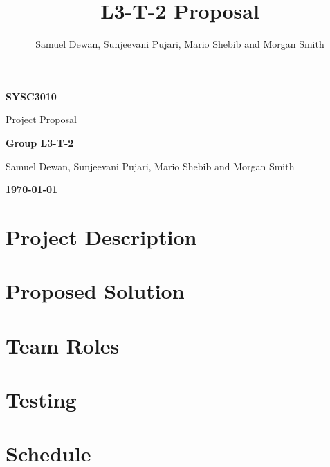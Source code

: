 \documentclass[11pt,letterpaper]{article}
\title{L3-T-2 Proposal}
\author{Samuel Dewan, Sunjeevani Pujari, Mario Shebib and Morgan Smith}
\begin{document}
\frenchspacing

\begin{titlepage}
\centering

{\large \textbf{SYSC3010}}

{\Huge \sffamily Project Proposal}

{\large \textbf{Group L3-T-2}}

Samuel Dewan, Sunjeevani Pujari, Mario Shebib and Morgan Smith


{\large \textbf{\today}}


\end{titlepage}

\tableofcontents
\clearpage
{}

\section{Project Description}
\label{sec:project-description}

\clearpage

\section{Proposed Solution}
\label{sec:proposed-solution}

\clearpage

\section{Team Roles}
\label{sec:team-roles}

\clearpage

\section{Testing}
\label{sec:testing}

\clearpage

\section{Schedule}
\label{sec:schedule}

\clearpage

{}

\clearpage
\end{document}
